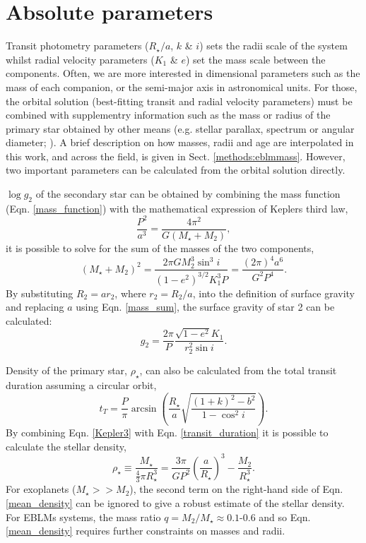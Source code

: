 \section{Absolute parameters}

Transit photometry parameters ($R_\star / a$, $k$ \& $i$) sets the radii scale of the system whilst radial velocity parameters ($K_1$ \& $e$) set the mass scale between the components. Often, we are more interested in dimensional parameters such as the mass of each companion, or the semi-major axis in astronomical units. For those, the orbital solution (best-fitting transit and radial velocity parameters) must be combined with supplementry information such as the mass or radius of the primary star obtained by other means (e.g. stellar parallax, spectrum or angular diameter; \citealt{2009IAUS..253...99W}). A brief description on how masses, radii and age are interpolated in this work, and across the field, is given in Sect. \ref{methods:eblmmass}. However, two important parameters can be calculated from the orbital solution directly. 

$\log g_2$ of the secondary star can be obtained by combining the mass function (Eqn. \ref{mass_function}) with the mathematical expression of Keplers third law,
%
\begin{equation}\label{Kepler3}
    \frac{P^2}{a^3} = \frac{4 \pi ^2}{G ( M_\star + M_2)},
\end{equation}
%
it is possible to solve for the sum of the masses of the two components,
%
\begin{equation}\label{mass_sum}
    (M_\star + M_2)^2 = \frac{2 \pi G M_2^3 \sin^3 i}{(1-e^2)^{3/2} K_1^3 P} = \frac{(2 \pi)^4 a^6}{G^2 P^4}.
\end{equation}
%
By substituting $R_2 = a r_2$, where $r_2 = R_2 / a$, into the definition of surface gravity and replacing $a$ using Eqn. \ref{mass_sum}, the surface gravity of star 2 can be calculated:
%
\begin{equation}\label{suface_gravity}
    g_2 = \frac{2 \pi}{P} \frac{\sqrt{1 - e^2} K_1}{r_2^2 \sin i}.
\end{equation}
%


Density of the primary star, $\rho_\star$, can also be calculated from the total transit duration assuming a circular orbit,
%
\begin{equation}\label{transit_duration}
    t_T = \frac{P}{\pi} \arcsin \left( \frac{R_\star}{a} \sqrt{\frac{(1 + k)^2 - b^2}{1 - \cos^2 i}} \right).
\end{equation}
%
By combining Eqn. \ref{Kepler3} with Eqn. \ref{transit_duration} it is possible to calculate the stellar density,
%
\begin{equation}\label{mean_density}
    \rho_\star \equiv \frac{M_\star}{\frac{4}{3} \pi R_\star^3} = \frac{3 \pi}{G P^2} \left( \frac{a}{R_\star} \right)^3 - \frac{M_2}{R_\star^3}.
\end{equation}
%
For exoplanets ($M_\star >> M_2$), the second term on the right-hand side of Eqn. \ref{mean_density} can be ignored to give a robust estimate of the stellar density. For EBLMs systems, the mass ratio $q = M_2 / M_\star \approx 0.1$-$0.6$ and so Eqn. \ref{mean_density} requires further constraints on masses and radii. 

